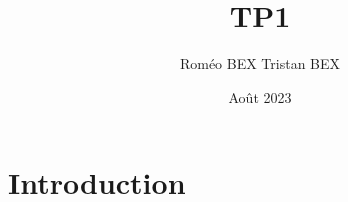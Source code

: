 \documentclass{article}
\title{TP1 }
\author{Roméo BEX Tristan BEX}
\date{Août 2023}
\begin{document}
\maketitle

\section{Introduction}
\end{document}
